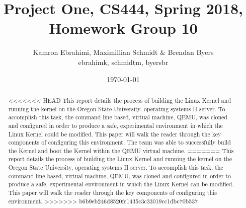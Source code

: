 \documentclass[10pt,onecolumn,draftclsnofoot]{IEEEtran} %
\title{ Project One, CS444, Spring 2018, Homework Group 10}
\author{Kamron Ebrahimi, Maximillian Schmidt \& Brendan Byers \\ ebrahimk, schmidtm, byersbr }
\date{\today}
\begin{document}
\begin{titlingpage}
\maketitle
\begin{abstract}
\begin{singlespace}
<<<<<<< HEAD
This report details the process of building the Linux Kernel and running the kernel on the Oregon State University, operating systems II server. To accomplish this task, the command line based, virtual machine, QEMU, was cloned and configured in order to produce a safe, experimental environment in which the Linux Kernel could be modified. This paper will walk the reader through the key components of configuring this environment. The team was able to successfully build the Kernel and boot the Kernel within the QEMU virtual machine.     %
=======
This report details the process of building the Linux Kernel and running the kernel on the Oregon State University, operating systems II server. To accomplish this task, the command line based, virtual machine, QEMU, was cloned and configured in order to produce a safe, experimental environment in which the Linux Kernel can be modified. This paper will walk the reader through the key components of configuring this environment.     %
>>>>>>> b6b9eb246d8520fe1435c3c33019cc1dbc70b537
\end{singlespace}
\end{abstract}
\end{titlingpage}


\tableofcontents
\end{document}
